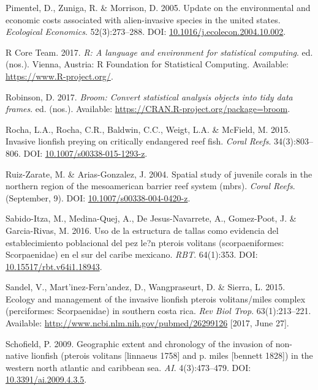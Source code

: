 \documentclass[12pt,]{article}
\begin{document}
\hypertarget{ref-pimentel_2005}{}
Pimentel, D., Zuniga, R. \& Morrison, D. 2005. Update on the
environmental and economic costs associated with alien-invasive species
in the united states. \emph{Ecological Economics}. 52(3):273--288. DOI:
\href{https://doi.org/10.1016/j.ecolecon.2004.10.002}{10.1016/j.ecolecon.2004.10.002}.

\hypertarget{ref-rcore_2017}{}
R Core Team. 2017. \emph{R: A language and environment for statistical
computing}. ed. (nos.). Vienna, Austria: R Foundation for Statistical
Computing. Available: \url{https://www.R-project.org/}.

\hypertarget{ref-broom_2017}{}
Robinson, D. 2017. \emph{Broom: Convert statistical analysis objects
into tidy data frames}. ed. (nos.). Available:
\url{https://CRAN.R-project.org/package=broom}.

\hypertarget{ref-rocha_2015}{}
Rocha, L.A., Rocha, C.R., Baldwin, C.C., Weigt, L.A. \& McField, M.
2015. Invasive lionfish preying on critically endangered reef fish.
\emph{Coral Reefs}. 34(3):803--806. DOI:
\href{https://doi.org/10.1007/s00338-015-1293-z}{10.1007/s00338-015-1293-z}.

\hypertarget{ref-ruizzarate_2004}{}
Ruiz-Zarate, M. \& Arias-Gonzalez, J. 2004. Spatial study of juvenile
corals in the northern region of the mesoamerican barrier reef system
(mbrs). \emph{Coral Reefs}. (September, 9). DOI:
\href{https://doi.org/10.1007/s00338-004-0420-z}{10.1007/s00338-004-0420-z}.

\hypertarget{ref-sabidoitza_2016}{}
Sabido-Itza, M., Medina-Quej, A., De Jesus-Navarrete, A., Gomez-Poot, J.
\& Garcia-Rivas, M. 2016. Uso de la estructura de tallas como evidencia
del establecimiento poblacional del pez le?n pterois volitans
(scorpaeniformes: Scorpaenidae) en el sur del caribe mexicano.
\emph{RBT}. 64(1):353. DOI:
\href{https://doi.org/10.15517/rbt.v64i1.18943}{10.15517/rbt.v64i1.18943}.

\hypertarget{ref-sandel_2015}{}
Sandel, V., Mart\a'inez-Fern\a'andez, D., Wangpraseurt, D. \& Sierra, L.
2015. Ecology and management of the invasive lionfish pterois
volitans/miles complex (perciformes: Scorpaenidae) in southern costa
rica. \emph{Rev Biol Trop}. 63(1):213--221. Available:
\url{http://www.ncbi.nlm.nih.gov/pubmed/26299126} {[}2017, June 27{]}.

\hypertarget{ref-schofield_2009}{}
Schofield, P. 2009. Geographic extent and chronology of the invasion of
non-native lionfish (pterois volitans {[}linnaeus 1758{]} and p. miles
{[}bennett 1828{]}) in the western north atlantic and caribbean sea.
\emph{AI}. 4(3):473--479. DOI:
\href{https://doi.org/10.3391/ai.2009.4.3.5}{10.3391/ai.2009.4.3.5}.
\end{document}
